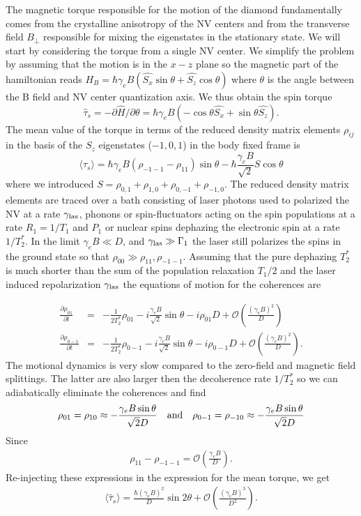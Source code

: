\documentclass[preprintnumbers,amsmath,amssymb,onecolumn,12pt]{revtex4}
\newcommand{\be}{\begin{equation}}
\newcommand{\ee}{\end{equation}}
\newcommand{\bea}{\begin{eqnarray}}
\newcommand{\eea}{\end{eqnarray}}
\begin{document}
The magnetic torque responsible for the motion of the diamond fundamentally comes from the crystalline anisotropy of the NV centers and from the transverse field $B_\perp$ responsible for mixing the eigenstates in the stationary state. We will start by considering the torque from a single NV center.
We simplify the problem by assuming that the motion is in the $x-z$ plane so the magnetic part of the hamiltonian reads 
$H_{B}= \hbar \gamma_e B  (\hat{S_x} \sin\theta + \hat{S_z} \cos\theta)$
where $\theta$ is the angle between the B field and NV center quantization axis.
We thus obtain the spin torque 
\be
\hat \tau_s = -\partial \hat{H} /\partial \theta = \hbar \gamma_e B (-\cos\theta \hat{S_x}+\sin\theta \hat{S_z}).
\ee
The mean value of the torque in terms of the reduced density matrix elements $\rho_{ij}$ in the basis of the $S_z$ eigenstates ($-1,0,1$) in the body fixed frame is
\be
\langle \hat \tau_s \rangle = \hbar \gamma_e B   (\rho_{-1-1}-\rho_{11})\sin\theta - \hbar \frac{\gamma_e B}{\sqrt{2}} S \cos\theta\label{torquemean}
\ee
where we introduced $S=\rho_{0,1}+\rho_{1,0}+\rho_{0,-1}+\rho_{-1,0}$.
The reduced density matrix elements are traced over a bath consisting of laser photons used to polarized the NV at a rate $\gamma_{\rm las}$, phonons or spin-fluctuators acting on the spin populations at a rate $R_1=1/T_1$ and 
$P_1$ or nuclear spins dephazing the electronic spin at a rate $1/T_2^*$.
In the limit $\gamma_e B \ll D$, and $\gamma_{\rm las}\gg \Gamma_1$ the laser still polarizes the spins in the ground state so that $\rho_{00}\gg {\rho_{11},\rho_{-1-1}}$.
Assuming that the pure dephazing $T_2^*$ is much shorter than the sum of the population relaxation $T_1/2$ and the laser induced repolarization $\gamma_{\rm las}$ the equations of motion for the coherences are 

\bea
\frac{\partial \rho_{01}}{\partial t}&=&-\frac{1}{2T_2^*} \rho_{01}-i\frac{ \gamma_e B}{\sqrt{2}}\sin\theta-i\rho_{01}D+\mathcal{O}(\frac{(\gamma_e B)^2}{D})\\
\frac{\partial \rho_{0-1}}{\partial t}&=&-\frac{1}{2T_2^*}  \rho_{0-1}-i\frac{ \gamma_e B}{\sqrt{2}}\sin\theta-i\rho_{0-1}D+\mathcal{O}(\frac{(\gamma_e B)^2}{D}).
\eea
The motional dynamics is very slow compared to the zero-field and magnetic field splittings. The latter are also larger then the decoherence rate $1/T_2^*$ so we can adiabatically eliminate the coherences and find 
\bea
\rho_{01}=\rho_{10}\approx-\frac{\gamma_e B \sin\theta}{\sqrt{2} D} \quad {\rm and} \quad \rho_{0-1}=\rho_{-10}\approx-\frac{\gamma_e B \sin\theta}{\sqrt{2} D}\eea
Since 
\bea
\rho_{11}-\rho_{-1-1}=\mathcal{O}(\frac{\gamma_e B}{D}).
\eea 
Re-injecting these expressions in the expression for the mean torque, we get 
\bea
\langle \hat \tau_s \rangle = \frac{\hbar(\gamma_e B)^2}{D}\sin2\theta
 +  \mathcal{O}(\frac{(\gamma_e B)^3}{D^2}).\label{torque_anal}
\eea
\end{document}
